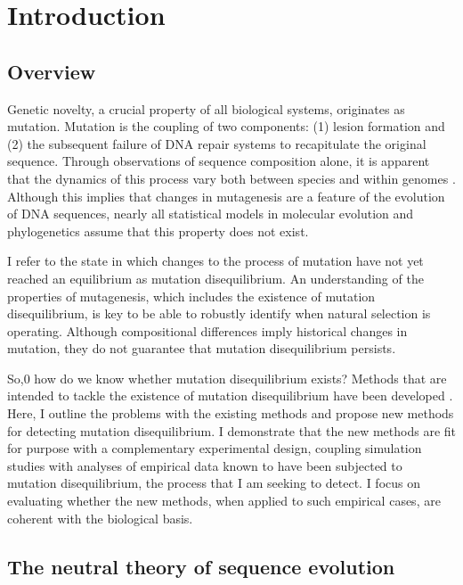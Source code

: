 \chapter{Introduction}

\section{Overview}
Genetic novelty, a crucial property of all biological systems, originates as mutation. Mutation is the coupling of two components: (1) lesion formation and (2) the subsequent failure of DNA repair systems to recapitulate the original sequence. Through observations of sequence composition alone, it is apparent that the dynamics of this process vary both between species \citep{Karlin1994ComparisonsSequences} and within genomes \citep{Francioli2015Genome-wideHumans}. Although this implies that changes in mutagenesis are a feature of the evolution of DNA sequences, nearly all statistical models in molecular evolution and phylogenetics assume that this property does not exist. 

I refer to the state in which changes to the process of mutation have not yet reached an \gls{equilibrium} as mutation disequilibrium. An understanding of the properties of mutagenesis, which includes the existence of mutation disequilibrium, is key to be able to robustly identify when natural selection is operating. Although compositional differences imply historical changes in mutation, they do not guarantee that mutation disequilibrium persists. 

So,0 how do we know whether mutation disequilibrium exists? Methods that are intended to tackle the existence of mutation disequilibrium have been developed \citep{Squartini2008QuantifyingProcess, Singh2009StrongDrosophila, Ababneh2006Matched-pairsSequences}. Here, I outline the problems with the existing methods and propose new methods for detecting mutation disequilibrium. I demonstrate that the new methods are fit for purpose with a complementary experimental design, coupling simulation studies with analyses of empirical data known to have been subjected to mutation disequilibrium, the process that I am seeking to detect. I focus on evaluating whether the new methods, when applied to such empirical cases, are coherent with the biological basis.

\section{The neutral theory of sequence evolution}

